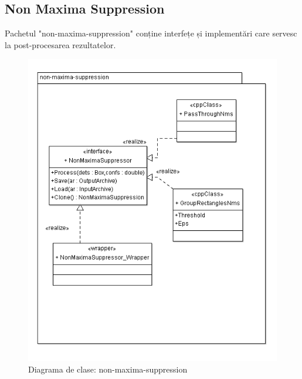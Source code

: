 \subsection{Non Maxima Suppression}
Pachetul "non-maxima-suppression" conține interfețe și implementări care servesc la post-procesarea rezultatelor.
\begin{figure}[H]
	\centering
		\includegraphics[width=1.00\textwidth]{uml/nonmaximasuppressionClassDiagram.png}
	\caption{Diagrama de clase: non-maxima-suppression}
	\label{fig:nonmaximasuppressionClassDiagram}
\end{figure}


